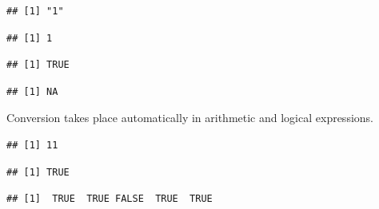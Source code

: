 \documentclass[krantz2]{krantz}\usepackage{knitr}
\begin{document}
\begin{knitrout}\footnotesize
{}\color{fgcolor}\begin{kframe}
\begin{alltt}
\hlstd{(}\hlstd{)}
\end{alltt}
\begin{verbatim}
## [1] "1"
\end{verbatim}
\begin{alltt}
\hlstd{(}\hlstd{)}
\end{alltt}
\begin{verbatim}
## [1] 1
\end{verbatim}
\begin{alltt}
\hlstd{(}\hlstd{)}
\end{alltt}
\begin{verbatim}
## [1] TRUE
\end{verbatim}
\begin{alltt}
\hlstd{(}\hlstd{)}
\end{alltt}
\begin{verbatim}
## [1] NA
\end{verbatim}
\end{kframe}
\end{knitrout}

Conversion takes place automatically in arithmetic and logical expressions.

\begin{knitrout}\footnotesize
{}\color{fgcolor}\begin{kframe}
\begin{alltt}
 \hlopt{+} 
\end{alltt}
\begin{verbatim}
## [1] 11
\end{verbatim}
\begin{alltt}
 \hlopt{||} 
\end{alltt}
\begin{verbatim}
## [1] TRUE
\end{verbatim}
\begin{alltt}
 \hlopt{| -}\hlopt{:}
\end{alltt}
\begin{verbatim}
## [1]  TRUE  TRUE FALSE  TRUE  TRUE
\end{verbatim}
\end{kframe}
\end{knitrout}
\end{document}
